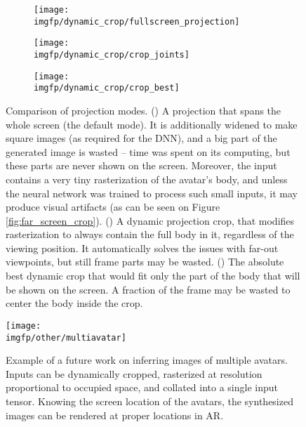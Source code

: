\begin{figure}
	\centering
	\begin{subfigure}[b]{0.45\textwidth}
		\centering
		\texttt{[image: \\imgfp/dynamic\_crop/fullscreen\_projection]}%
		\caption{}
		\label{fig:explain_crop_fullscreen}
	\end{subfigure}
	\hfill
	\begin{subfigure}[b]{0.27\textwidth}
		\centering
		\texttt{[image: \\imgfp/dynamic\_crop/crop\_joints]}
		\caption{}
		\label{fig:explain_crop_joints}
	\end{subfigure}
	\hfill
	\begin{subfigure}[b]{0.25\textwidth}
		\centering
		\texttt{[image: \\imgfp/dynamic\_crop/crop\_best]}
		\caption{}
		\label{fig:explain_crop_best}
	\end{subfigure}
	\caption{Comparison of projection modes. (\protect{}) A projection that spans the whole screen (the default mode). It is additionally widened to make square images (as required for the DNN), and a big part of the generated image is wasted -- time was spent on its computing, but these parts are never shown on the screen. Moreover, the input contains a very tiny rasterization of the avatar's body, and unless the neural network was trained to process such small inputs, it may produce visual artifacts (as can be seen on Figure \ref{fig:far_screen_crop}). (\protect{}) A dynamic projection crop, that modifies rasterization to always contain the full body in it, regardless of the viewing position. It automatically solves the issues with far-out viewpoints, but still frame parts may be wasted. (\protect{}) The absolute best dynamic crop that would fit only the part of the body that will be shown on the screen. A fraction of the frame may be wasted to center the body inside the crop. }
	\label{fig:explain_crop}
\end{figure}
\begin{figure}
	\centering%
	\setlength\abovedisplayskip{0pt}%
	\texttt{[image: \\imgfp/other/multiavatar]}%
	\caption{Example of a future work on inferring images of multiple avatars. Inputs can be dynamically cropped, rasterized at resolution proportional to occupied space, and collated into a single input tensor. Knowing the screen location of the avatars, the synthesized images can be rendered at proper locations in AR.}%
	\label{fig:multiavatar}%
	\setlength\belowdisplayskip{0pt}%
\end{figure}

